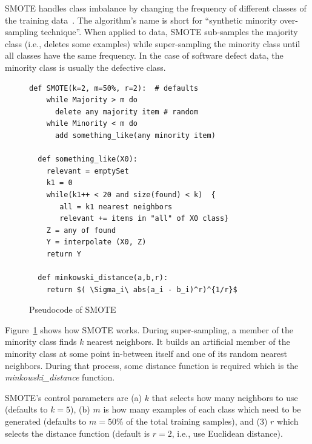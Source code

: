 \documentclass[sigconf]{acmart}
\theoremstyle{break}
\newcommand{\sma}{{\sc SMOTE}}
\begin{document}
{\sma} handles class imbalance by changing the frequency of different classes of the training
data~\cite{chawla2002smote}. 
The algorithm's name is short for ``synthetic minority over-sampling technique''.
When applied to data, {\sma} sub-samples the majority class (i.e., deletes some examples)
while super-sampling the minority class
until
all classes have the same frequency.  In the case of software defect data,
the minority class is usually the  defective class.

 \begin{figure}\small
\begin{lstlisting}[mathescape,linewidth=2in,frame=n,numbers=none]
  def SMOTE(k=2, m=50%, r=2):  # defaults
    while Majority > m do
      delete any majority item # random
    while Minority < m do
      add something_like(any minority item)
      
  def something_like(X0): 
    relevant = emptySet
    k1 = 0
    while(k1++ < 20 and size(found) < k)  {
       all = k1 nearest neighbors
       relevant += items in "all" of X0 class}
    Z = any of found
    Y = interpolate (X0, Z)
    return Y
    
  def minkowski_distance(a,b,r): 
    return $( \Sigma_i\ abs(a_i - b_i)^r)^{1/r}$
\end{lstlisting} 
\vspace{-0.2cm}
\caption{Pseudocode of SMOTE}
\label{fig:pseudocode} 
\vspace{-0.4cm}
\end{figure}

Figure~\ref{fig:pseudocode} shows how {\sma} works. During super-sampling,
a member of the minority class finds $k$ nearest neighbors. It builds an artificial member
of the minority class at some point in-between itself and one of its random nearest
neighbors.  During that process, some distance function is required which is the {\em minkowski\_distance} function. 

{\sma}'s control parameters are (a) $k$ that selects how many neighbors to use  (defaults to $k=5$), (b) $m$ is how many examples of each class which need to be generated (defaults to $m=50\%$ of the total training samples), and (3) $r$ which selects  the distance function (default is $r=2$,
i.e., use    
  Euclidean distance).
\end{document}
